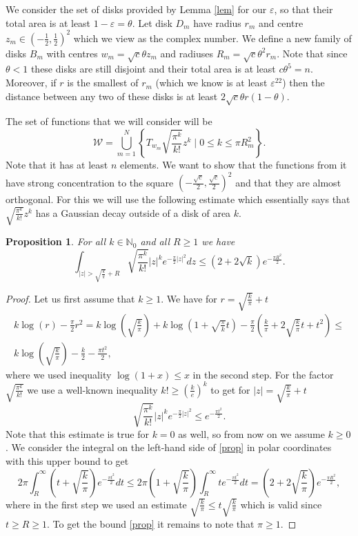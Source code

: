 \documentclass[12pt]{amsart}
\numberwithin{equation}{section}
\newcommand{\N}{\mathbb{N}}
\newcommand{\eps}{\varepsilon}
\newtheorem{proposition}[Thm]{Proposition}
\begin{document}
We consider the set of disks provided by Lemma \ref{lem} for our $\eps$, so that their total area is at least $1-\eps = \theta$. Let disk $D_m$ have radius $r_m$ and centre $z_m\in \left(-\frac{1}{2},\frac{1}{2}\right)^2$ which we view as the complex number. We define a new family of disks $B_m$ with centres $w_m=\sqrt{c}\theta z_m$ and radiuses $R_m=\sqrt{c}\theta^2 r_m$. Note that since $\theta < 1$ these disks are still disjoint and their total area is at least $c\theta^5 = n$. Moreover, if $r$ is the smallest of $r_m$ (which we know is at least $\eps^{22}$) then the distance between any two of these disks is at least $2\sqrt{c}\theta r (1-\theta)$.

The set of functions that we will consider will be $$\mathcal{W}=\bigcup_{m=1}^N\left\{ T_{w_m}\sqrt{\frac{\pi^k}{k!}}z^k\mid 0 \le k \le \pi R_m^2\right\}.$$
Note that it has at least $n$ elements. We want to show that the functions from it have strong concentration to the square $\left(-\frac{\sqrt{c}}{2},\frac{\sqrt{c}}{2}\right)^2$ and that they are almost orthogonal. For this we will use the following estimate which essentially says that $\sqrt{\frac{\pi^k}{k!}}z^k$ has a Gaussian decay outside of a disk of area $k$.
\begin{proposition}
For all $k\in \N_0$ and all $R \ge 1$ we have
\begin{equation}\label{prop}
\int_{|z| > \sqrt{\frac{k}{\pi}}+R}\sqrt{\frac{\pi^k}{k!}}|z|^k e^{-\frac{\pi}{2}|z|^2}dz \le  (2+2\sqrt{k})e^{-\frac{\pi R^2}{2}}.
\end{equation}
\end{proposition}
\begin{proof}
Let us first assume that $k \ge 1$. We have for $r = \sqrt{\frac{k}{\pi}}+t$
\begin{align*}
k\log(r) - \frac{\pi}{2}r^2 = k\log\left(\sqrt{\frac{k}{\pi}}\right) + k\log\left(1+\sqrt{\frac{\pi}{k}}t\right) -\frac{\pi}{2} \left(\frac{k}{\pi} + 2\sqrt{\frac{k}{\pi}}t + t^2\right)\le \\ k\log\left(\sqrt{\frac{k}{\pi}}\right)  - \frac{k}{2} - \frac{\pi t^2}{2},
\end{align*}
where we used inequality $\log(1+x)\le x$ in the second step. For the factor $\sqrt{\frac{\pi^k}{k!}}$ we use a well-known inequality $k! \ge \left(\frac{k}{e}\right)^k$ to get for $|z| = \sqrt{\frac{k}{\pi}} + t$
$$\sqrt{\frac{\pi^k}{k!}}|z|^k e^{-\frac{\pi}{2}|z|^2} \le e^{-\frac{\pi t^2}{2}}.$$
Note that this estimate is true for $k = 0$ as well, so from now on we assume $k \ge 0$. We consider the integral on the left-hand side of \eqref{prop} in polar coordinates with this upper bound to get
$$2\pi \int_{R}^\infty \left(t+\sqrt{\frac{k}{\pi}}\right)e^{-\frac{\pi t^2}{2}}dt \le 2\pi \left(1+ \sqrt{\frac{k}{\pi}}\right)\int_R^\infty te^{-\frac{\pi t^2}{2}}dt = \left(2 + 2\sqrt{\frac{k}{\pi}}\right)e^{-\frac{\pi R^2}{2}},$$ 
where in the first step we used an estimate $\sqrt{\frac{k}{\pi}} \le t\sqrt{\frac{k}{\pi}}$ which is valid since $t\ge R \ge 1$. To get the bound \eqref{prop} it remains to note that $\pi \ge 1$.
\end{proof}
\end{document}
